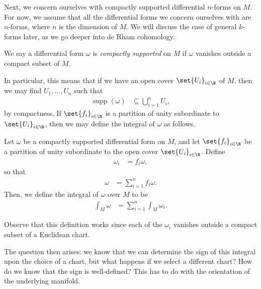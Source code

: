 \documentclass[10pt]{mypackage}
\begin{document}
Next, we concern ourselves with compactly supported differential $n$-forms on $M$. For now, we assume that all the differential forms we concern ourselves with are $n$-forms, where $n$ is the dimension of $M$. We will discuss the case of general $k$-forms later, as we go deeper into de Rham cohomology.
\begin{definition}
  We say a differential form $\omega$ is \textit{compactly supported} on $M$ if $\omega$ vanishes outside a compact subset of $M$.
\end{definition}
In particular, this means that if we have an open cover $\set{U_i}_{i\in\N}$ of $M$, then we may find $U_1,\dots,U_n$ such that
\begin{align*}
  \operatorname{supp}\left( \omega \right) &\subseteq \bigcup_{i=1}^{n}U_i,
\end{align*}
by compactness. If $\set{f_i}_{i\in\N}$ is a partition of unity subordinate to $ \set{U_i}_{i\in \N} $, then we may define the integral of $\omega$ as follows.
\begin{definition}
  Let $\omega$ be a compactly supported differential form on $M$, and let $\set{f_i}_{i\in \N}$ be a partition of unity subordinate to the open cover $\set{U_i}_{i\in \N}$. Define
  \begin{align*}
    \omega_i &= f_i\omega,
  \end{align*}
  so that
  \begin{align*}
    \omega &= \sum_{i=1}^{n}f_i\omega.
  \end{align*}
  Then, we define the integral of $\omega$ over $M$ to be
  \begin{align*}
    \int_{M}^{}\omega &= \sum_{i=1}^{n} \int_{M}^{}\omega_i.
  \end{align*}
\end{definition}
Observe that this definition works since each of the $\omega_i$ vanishes outside a compact subset of a Euclidean chart.\newline

The question then arises: we know that we can determine the sign of this integral upon the choice of a chart, but what happens if we select a different chart? How do we know that the sign is well-defined? This has to do with the orientation of the underlying manifold.
\end{document}
